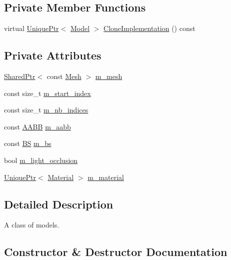 \subsection*{Private Member Functions}
\begin{DoxyCompactItemize}
\item 
virtual \hyperlink{namespacemage_a3316d7143a973e37adf1110f2e80ca31}{Unique\+Ptr}$<$ \hyperlink{classmage_1_1_model}{Model} $>$ \hyperlink{classmage_1_1_model_a4e32ba81c5305dd23dfe760765a5b7d2}{Clone\+Implementation} () const
\end{DoxyCompactItemize}
\subsection*{Private Attributes}
\begin{DoxyCompactItemize}
\item 
\hyperlink{namespacemage_a1e01ae66713838a7a67d30e44c67703e}{Shared\+Ptr}$<$ const \hyperlink{classmage_1_1_mesh}{Mesh} $>$ \hyperlink{classmage_1_1_model_aecd2b4031c5df30fb5f7ed6d62810f73}{m\+\_\+mesh}
\item 
const size\+\_\+t \hyperlink{classmage_1_1_model_a63a3e697c9eb1606249de15cc7b818c3}{m\+\_\+start\+\_\+index}
\item 
const size\+\_\+t \hyperlink{classmage_1_1_model_a1fcf80ed9f3002bd2319ef83f073ae75}{m\+\_\+nb\+\_\+indices}
\item 
const \hyperlink{structmage_1_1_a_a_b_b}{A\+A\+BB} \hyperlink{classmage_1_1_model_ab53a0f253df545fd59723bee107bf523}{m\+\_\+aabb}
\item 
const \hyperlink{structmage_1_1_b_s}{BS} \hyperlink{classmage_1_1_model_a1d3ea0a9f302f623dcaceb2df4315a0b}{m\+\_\+bs}
\item 
bool \hyperlink{classmage_1_1_model_af6e1183a2f2147b7848aa10010bdfcd3}{m\+\_\+light\+\_\+occlusion}
\item 
\hyperlink{namespacemage_a3316d7143a973e37adf1110f2e80ca31}{Unique\+Ptr}$<$ \hyperlink{classmage_1_1_material}{Material} $>$ \hyperlink{classmage_1_1_model_a88d97cd87b7ef37130f7a4007477698a}{m\+\_\+material}
\end{DoxyCompactItemize}


\subsection{Detailed Description}
A class of models. 

\subsection{Constructor \& Destructor Documentation}
\hypertarget{classmage_1_1_model_a6f67b215aa2db0a593ef7a8ee77fb4d3}{}\label{classmage_1_1_model_a6f67b215aa2db0a593ef7a8ee77fb4d3} 
